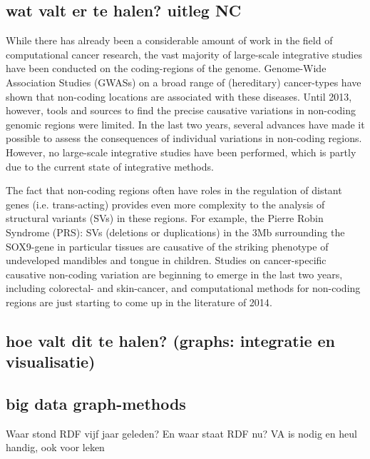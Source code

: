 \documentclass[twoside,fontsize=12pt]{article}
\begin{document}
\subsection*{	wat valt er te halen? uitleg NC}
While there has already been a considerable amount of work in the field of computational cancer research, the vast majority of large-scale integrative studies have been conducted on the coding-regions of the genome\cite{ENCODE}. Genome-Wide Association Studies (GWASs) on a broad range of (hereditary) cancer-types have shown that non-coding locations are associated with these diseases. Until 2013, however, tools and sources to find the precise causative variations in non-coding genomic regions were limited. In the last two years, several advances have made it possible to assess the consequences of individual variations in non-coding regions\cite{Ongen2014,Khurana2013}. However, no large-scale integrative studies have been performed, which is partly due to the current state of integrative methods. 

The fact that non-coding regions often have roles in the regulation of distant genes (i.e. trans-acting) provides even more complexity to the analysis of structural variants (SVs) in these regions. For example, the Pierre Robin Syndrome (PRS): SVs (deletions or duplications) in the 3Mb surrounding the SOX9-gene in particular tissues are causative of the striking phenotype of undeveloped mandibles and tongue in children\cite{Benko2009,Kurth2009}. Studies on cancer-specific causative non-coding variation are beginning to emerge in the last two years, including colorectal- and skin-cancer\cite{Ongen2014,Huang2013}, and computational methods for non-coding regions are just starting to come up in the literature of 2014\cite{Khurana2013,Kircher2014}.  
\subsection*{hoe valt dit te halen? (graphs: integratie en visualisatie)}
\subsection*{	big data graph-methods}
Waar stond RDF vijf jaar geleden? En waar staat RDF nu?
VA is nodig en heul handig, ook voor leken
\end{document}
